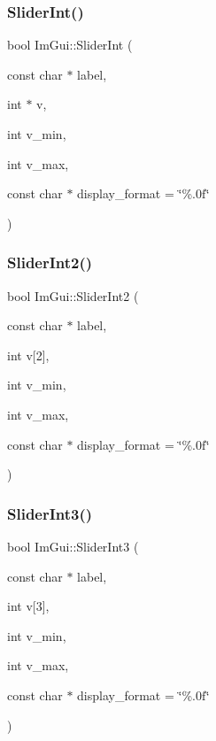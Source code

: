 \subsubsection{\texorpdfstring{Slider\+Int()}{SliderInt()}}
{\footnotesize\ttfamily bool Im\+Gui\+::\+Slider\+Int (\begin{DoxyParamCaption}\item[{const char $\ast$}]{label,  }\item[{int $\ast$}]{v,  }\item[{int}]{v\+\_\+min,  }\item[{int}]{v\+\_\+max,  }\item[{const char $\ast$}]{display\+\_\+format = {\ttfamily \char`\"{}\%.0f\char`\"{}} }\end{DoxyParamCaption})}

\hypertarget{namespace_im_gui_a9dbd0490704d3bb4be10fdebe21d402d}{}\label{namespace_im_gui_a9dbd0490704d3bb4be10fdebe21d402d} 
\subsubsection{\texorpdfstring{Slider\+Int2()}{SliderInt2()}}
{\footnotesize\ttfamily bool Im\+Gui\+::\+Slider\+Int2 (\begin{DoxyParamCaption}\item[{const char $\ast$}]{label,  }\item[{int}]{v\mbox{[}2\mbox{]},  }\item[{int}]{v\+\_\+min,  }\item[{int}]{v\+\_\+max,  }\item[{const char $\ast$}]{display\+\_\+format = {\ttfamily \char`\"{}\%.0f\char`\"{}} }\end{DoxyParamCaption})}

\hypertarget{namespace_im_gui_a099188a7fdaad1a8103e6e24f41e1a8a}{}\label{namespace_im_gui_a099188a7fdaad1a8103e6e24f41e1a8a} 
\subsubsection{\texorpdfstring{Slider\+Int3()}{SliderInt3()}}
{\footnotesize\ttfamily bool Im\+Gui\+::\+Slider\+Int3 (\begin{DoxyParamCaption}\item[{const char $\ast$}]{label,  }\item[{int}]{v\mbox{[}3\mbox{]},  }\item[{int}]{v\+\_\+min,  }\item[{int}]{v\+\_\+max,  }\item[{const char $\ast$}]{display\+\_\+format = {\ttfamily \char`\"{}\%.0f\char`\"{}} }\end{DoxyParamCaption})}

